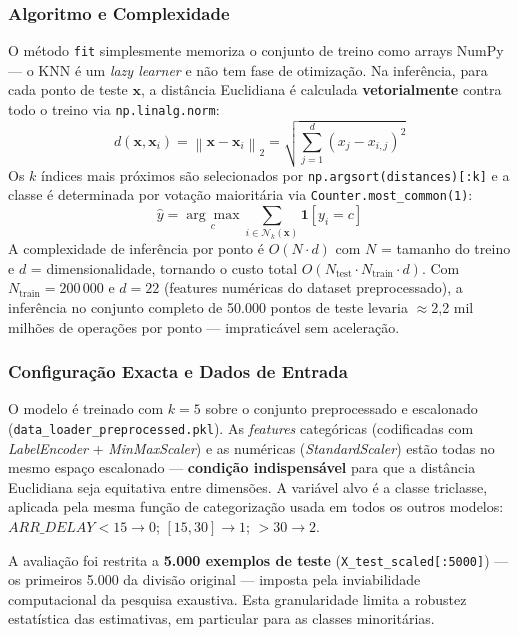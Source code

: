 \documentclass[conference]{IEEEtran}
\begin{document}
\subsubsection{Algoritmo e Complexidade}
O método \texttt{fit} simplesmente memoriza o conjunto de treino como arrays
NumPy — o KNN é um \emph{lazy learner} e não tem fase de otimização. Na inferência,
para cada ponto de teste $\mathbf{x}$, a distância Euclidiana é calculada
\textbf{vetorialmente} contra todo o treino via \texttt{np.linalg.norm}:
\begin{equation}
d(\mathbf{x}, \mathbf{x}_i) = \left\|\mathbf{x} - \mathbf{x}_i\right\|_2
= \sqrt{\sum_{j=1}^{d}(x_j - x_{i,j})^2}
\end{equation}
Os $k$ índices mais próximos são selecionados por \texttt{np.argsort(distances)[:k]}
e a classe é determinada por votação maioritária via \texttt{Counter.most\_common(1)}:
\begin{equation}
\hat{y} = \underset{c}{\arg\max} \sum_{i \in \mathcal{N}_k(\mathbf{x})} \mathbf{1}[y_i = c]
\end{equation}
A complexidade de inferência por ponto é $O(N \cdot d)$ com $N$ = tamanho do
treino e $d$ = dimensionalidade, tornando o custo total $O(N_{\text{test}} \cdot N_{\text{train}} \cdot d)$.
Com $N_{\text{train}} = 200\,000$ e $d = 22$ (features numéricas do dataset
preprocessado), a inferência no conjunto completo de 50.000 pontos de teste
levaria $\approx$2,2 mil milhões de operações por ponto — impraticável sem
aceleração.

\subsubsection{Configuração Exacta e Dados de Entrada}
O modelo é treinado com $k=5$ sobre o conjunto preprocessado e escalonado
(\texttt{data\_loader\_preprocessed.pkl}). As \textit{features} categóricas
(codificadas com \textit{LabelEncoder} + \textit{MinMaxScaler}) e as numéricas
(\textit{StandardScaler}) estão todas no mesmo espaço escalonado —
\textbf{condição indispensável} para que a distância Euclidiana seja equitativa
entre dimensões. A variável alvo é a classe triclasse, aplicada pela mesma
função de categorização usada em todos os outros modelos:
$\textit{ARR\_DELAY} < 15 \to 0$; $[15,30] \to 1$; $>30 \to 2$.

A avaliação foi restrita a \textbf{5.000 exemplos de teste}
(\texttt{X\_test\_scaled[:5000]}) — os primeiros 5.000 da divisão original —
imposta pela inviabilidade computacional da pesquisa exaustiva. Esta
granularidade limita a robustez estatística das estimativas, em particular para
as classes minoritárias.
\end{document}
